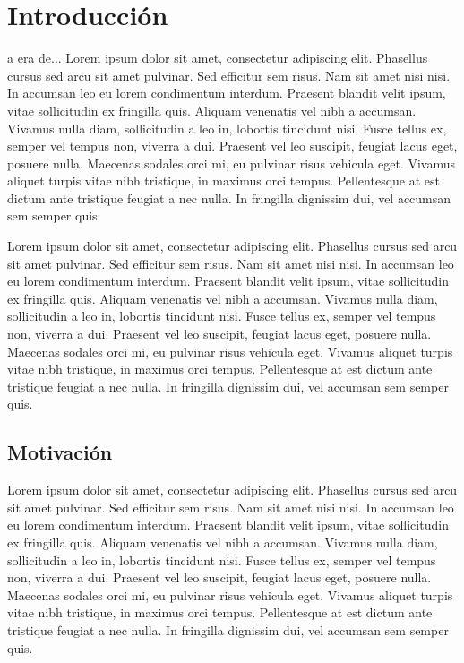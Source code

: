 \chapter{Introducción}
\label{chap:intro}

a era de... Lorem ipsum dolor sit amet, consectetur adipiscing elit. Phasellus cursus sed arcu sit amet pulvinar. Sed efficitur sem risus. Nam sit amet nisi nisi. In accumsan leo eu lorem condimentum interdum. Praesent blandit velit ipsum, vitae sollicitudin ex fringilla quis. Aliquam venenatis vel nibh a accumsan. Vivamus nulla diam, sollicitudin a leo in, lobortis tincidunt nisi. Fusce tellus ex, semper vel tempus non, viverra a dui. Praesent vel leo suscipit, feugiat lacus eget, posuere nulla. Maecenas sodales orci mi, eu pulvinar risus vehicula eget. Vivamus aliquet turpis vitae nibh tristique, in maximus orci tempus. Pellentesque at est dictum ante tristique feugiat a nec nulla. In fringilla dignissim dui, vel accumsan sem semper quis.

Lorem ipsum dolor sit amet, consectetur adipiscing elit. Phasellus cursus sed arcu sit amet pulvinar. Sed efficitur sem risus. Nam sit amet nisi nisi. In accumsan leo eu lorem condimentum interdum. Praesent blandit velit ipsum, vitae sollicitudin ex fringilla quis. Aliquam venenatis vel nibh a accumsan. Vivamus nulla diam, sollicitudin a leo in, lobortis tincidunt nisi. Fusce tellus ex, semper vel tempus non, viverra a dui. Praesent vel leo suscipit, feugiat lacus eget, posuere nulla. Maecenas sodales orci mi, eu pulvinar risus vehicula eget. Vivamus aliquet turpis vitae nibh tristique, in maximus orci tempus. Pellentesque at est dictum ante tristique feugiat a nec nulla. In fringilla dignissim dui, vel accumsan sem semper quis.

\section{Motivación}

Lorem ipsum dolor sit amet, consectetur adipiscing elit. Phasellus cursus sed arcu sit amet pulvinar. Sed efficitur sem risus. Nam sit amet nisi nisi. In accumsan leo eu lorem condimentum interdum. Praesent blandit velit ipsum, vitae sollicitudin ex fringilla quis. Aliquam venenatis vel nibh a accumsan. Vivamus nulla diam, sollicitudin a leo in, lobortis tincidunt nisi. Fusce tellus ex, semper vel tempus non, viverra a dui. Praesent vel leo suscipit, feugiat lacus eget, posuere nulla. Maecenas sodales orci mi, eu pulvinar risus vehicula eget. Vivamus aliquet turpis vitae nibh tristique, in maximus orci tempus. Pellentesque at est dictum ante tristique feugiat a nec nulla. In fringilla dignissim dui, vel accumsan sem semper quis.

